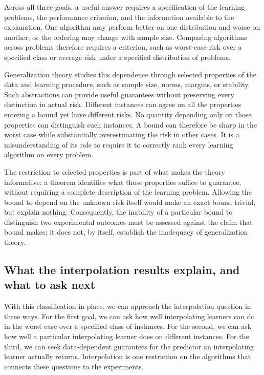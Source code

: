 \documentclass[11pt,twoside]{article}
\theoremstyle{definition}
\theoremstyle{remark}
\begin{document}
Across all three goals, a useful answer requires a specification of the
learning problems, the performance criterion, and the information available
to the explanation. One algorithm may perform better on one distribution
and worse on another, or the ordering may change with sample size. Comparing
algorithms across problems therefore requires a criterion, such as worst-case
risk over a specified class or average risk under a specified distribution
of problems.

Generalization theory studies this dependence through selected properties
of the data and learning procedure, such as sample size, norms, margins,
or stability. Such abstractions can provide useful guarantees without
preserving every distinction in actual risk. Different instances can agree
on all the properties entering a bound yet have different risks. No quantity
depending only on those properties can distinguish such instances. A bound
can therefore be sharp in the worst case while substantially overestimating
the risk in other cases. It is a misunderstanding of its role to require
it to correctly rank every learning algorithm on every problem.

The restriction to selected properties is part of what makes the theory
informative: a theorem identifies what those properties suffice to guarantee,
without requiring a complete description of the learning problem. Allowing
the bound to depend on the unknown risk itself would make an exact bound
trivial, but explain nothing. Consequently, the inability of a particular
bound to distinguish two experimental outcomes must be assessed against the
claim that bound makes; it does not, by itself, establish the inadequacy of
generalization theory.

\subsection{What the interpolation results explain, and what to ask next}

With this classification in place, we can approach the interpolation
question in three ways. For the first goal, we can ask how well interpolating
learners can do in the worst case over a specified class of instances. For
the second, we can ask how well a particular interpolating learner does on
different instances. For the third, we can seek data-dependent guarantees
for the predictor an interpolating learner actually returns. Interpolation
is one restriction on the algorithms that connects these questions to
the experiments.
\end{document}
